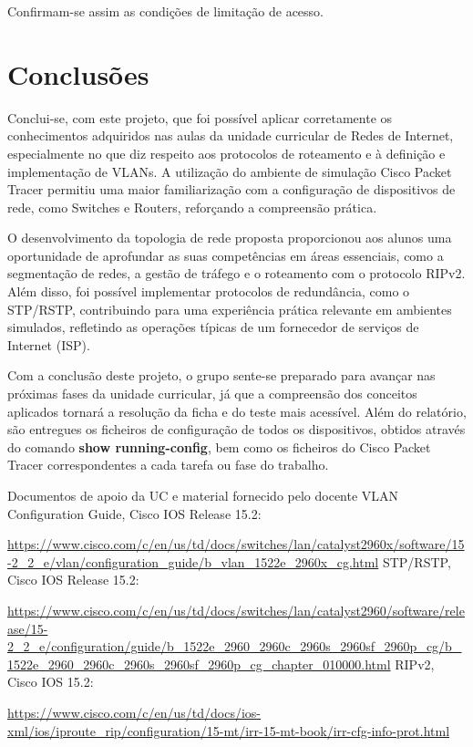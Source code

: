 \documentclass[11pt,english, openright, oneside]{book}
\begin{document}
Confirmam-se assim as condições de limitação de acesso. \par

\pagebreak
\chapter{Conclusões}
\vspace{0.2cm}

Conclui-se, com este projeto, que foi possível aplicar corretamente os conhecimentos adquiridos nas aulas da unidade curricular de Redes de Internet, especialmente no que diz respeito aos protocolos de roteamento e à definição e implementação de VLANs. A utilização do ambiente de simulação Cisco Packet Tracer permitiu uma maior familiarização com a configuração de dispositivos de rede, como Switches e Routers, reforçando a compreensão prática.

\par O desenvolvimento da topologia de rede proposta proporcionou aos alunos uma oportunidade de aprofundar as suas competências em áreas essenciais, como a segmentação de redes, a gestão de tráfego e o roteamento com o protocolo RIPv2. Além disso, foi possível implementar protocolos de redundância, como o STP/RSTP, contribuindo para uma experiência prática relevante em ambientes simulados, refletindo as operações típicas de um fornecedor de serviços de Internet (ISP).

Com a conclusão deste projeto, o grupo sente-se preparado para avançar nas próximas fases da unidade curricular, já que a compreensão dos conceitos aplicados tornará a resolução da ficha e do teste mais acessível. Além do relatório, são entregues os ficheiros de configuração de todos os dispositivos, obtidos através do comando \textbf{show running-config}, bem como os ficheiros do Cisco Packet Tracer correspondentes a cada tarefa ou fase do trabalho.


\begin{thebibliography}{4} %
     Documentos de apoio da UC e material fornecido pelo docente
     VLAN Configuration Guide, Cisco IOS Release 15.2: \par
    \url{https://www.cisco.com/c/en/us/td/docs/switches/lan/catalyst2960x/software/15-2_2_e/vlan/configuration_guide/b_vlan_1522e_2960x_cg.html}
     STP/RSTP, Cisco IOS Release 15.2: \par
    \url{https://www.cisco.com/c/en/us/td/docs/switches/lan/catalyst2960/software/release/15-2_2_e/configuration/guide/b_1522e_2960_2960c_2960s_2960sf_2960p_cg/b_1522e_2960_2960c_2960s_2960sf_2960p_cg_chapter_010000.html}
     RIPv2, Cisco IOS 15.2: \par
    \url{https://www.cisco.com/c/en/us/td/docs/ios-xml/ios/iproute_rip/configuration/15-mt/irr-15-mt-book/irr-cfg-info-prot.html}
\end{thebibliography}

\mainmatter
\end{document}
